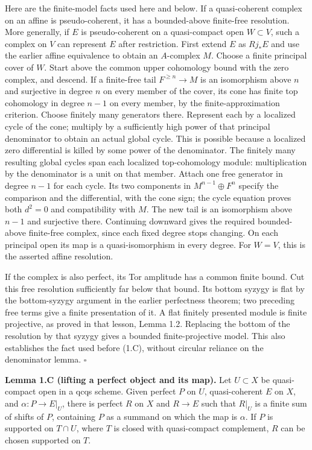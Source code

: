 \documentclass[11pt]{article}
\begin{document}
Here are the finite-model facts used here and below. If a quasi-coherent
complex on an affine is pseudo-coherent, it has a bounded-above
finite-free resolution. More generally, if \(E\) is pseudo-coherent on a
quasi-compact open \(W\subset V\), such a complex on \(V\) can represent
\(E\) after restriction. First extend \(E\) as \(Rj_*E\) and use the
earlier affine equivalence to obtain an \(A\)-complex \(M\). Choose a
finite principal cover of \(W\). Start above the common upper cohomology
bound with the zero complex, and descend. If a finite-free tail
\(F^{\ge n}\to M\) is an isomorphism above \(n\) and surjective in
degree \(n\) on every member of the cover, its cone has finite top
cohomology in degree \(n-1\) on every member, by the
finite-approximation criterion. Choose finitely many generators there.
Represent each by a localized cycle of the cone; multiply by a
sufficiently high power of that principal denominator to obtain an
actual global cycle. This is possible because a localized zero
differential is killed by some power of the denominator. The finitely
many resulting global cycles span each localized top-cohomology module:
multiplication by the denominator is a unit on that member. Attach one
free generator in degree \(n-1\) for each cycle. Its two components in
\(M^{n-1}\oplus F^n\) specify the comparison and the differential, with
the cone sign; the cycle equation proves both \(d^2=0\) and
compatibility with \(M\). The new tail is an isomorphism above \(n-1\)
and surjective there. Continuing downward gives the required
bounded-above finite-free complex, since each fixed degree stops
changing. On each principal open its map is a quasi-isomorphism in every
degree. For \(W=V\), this is the asserted affine resolution.

If the complex is also perfect, its Tor amplitude has a common finite
bound. Cut this free resolution sufficiently far below that bound. Its
bottom syzygy is flat by the bottom-syzygy argument in the earlier
perfectness theorem; two preceding free terms give a finite presentation
of it. A flat finitely presented module is finite projective, as proved
in that lesson, Lemma 1.2. Replacing the bottom of the resolution by
that syzygy gives a bounded finite-projective model. This also
establishes the fact used before (1.C), without circular reliance on the
denominator lemma. \(\square\)

\textbf{Lemma 1.C (lifting a perfect object and its map).} Let
\(U\subset X\) be quasi-compact open in a qcqs scheme. Given perfect
\(P\) on \(U\), quasi-coherent \(E\) on \(X\), and \(\alpha:P\to E|_U\),
there is perfect \(R\) on \(X\) and \(R\to E\) such that \(R|_U\) is a
finite sum of shifts of \(P\), containing \(P\) as a summand on which
the map is \(\alpha\). If \(P\) is supported on \(T\cap U\), where \(T\)
is closed with quasi-compact complement, \(R\) can be chosen supported
on \(T\).
\end{document}

